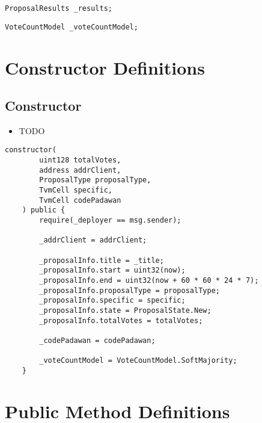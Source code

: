 \begin{lstlisting}[firstnumber=20]
    ProposalResults _results;
\end{lstlisting}

\begin{lstlisting}[firstnumber=21]
    VoteCountModel _voteCountModel;
\end{lstlisting}

\section{Constructor Definitions}


\subsection{Constructor}

\begin{itemize}
\item TODO
\end{itemize}

\begin{lstlisting}[firstnumber=25]
    constructor(
        uint128 totalVotes,
        address addrClient,
        ProposalType proposalType,
        TvmCell specific,
        TvmCell codePadawan
    ) public {
        require(_deployer == msg.sender);

        _addrClient = addrClient;

        _proposalInfo.title = _title;
        _proposalInfo.start = uint32(now);
        _proposalInfo.end = uint32(now + 60 * 60 * 24 * 7);
        _proposalInfo.proposalType = proposalType;
        _proposalInfo.specific = specific;
        _proposalInfo.state = ProposalState.New;
        _proposalInfo.totalVotes = totalVotes;

        _codePadawan = codePadawan;

        _voteCountModel = VoteCountModel.SoftMajority;
    }
\end{lstlisting}

\section{Public Method Definitions}


